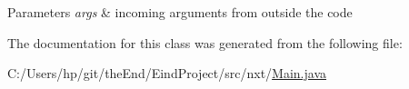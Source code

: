 \begin{DoxyParams}{Parameters}
{\em args} & incoming arguments from outside the code \\
\hline
\end{DoxyParams}


The documentation for this class was generated from the following file\-:\begin{DoxyCompactItemize}
\item 
C\-:/\-Users/hp/git/the\-End/\-Eind\-Project/src/nxt/\hyperlink{_main_8java}{Main.\-java}\end{DoxyCompactItemize}
